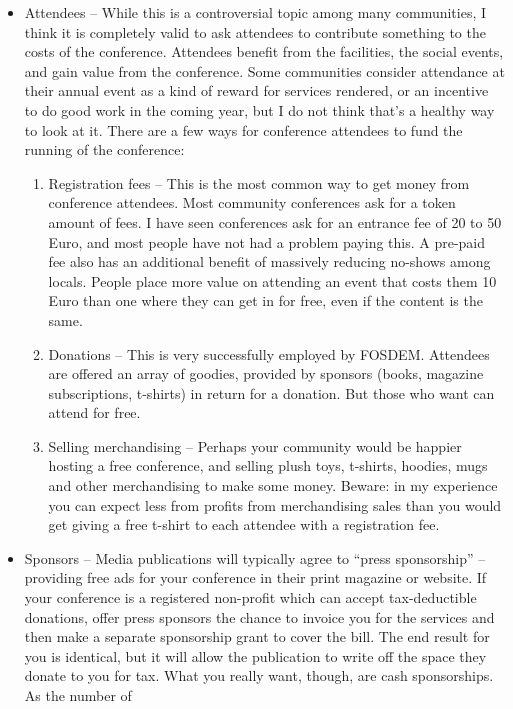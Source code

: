 \begin{itemize}
 \item Attendees -- While this is a controversial topic among many
communities, I think it is completely valid to ask attendees to
contribute something to the costs of the conference. Attendees benefit
from the facilities, the social events, and gain value from the conference.
Some communities consider attendance at their annual event as a kind of
reward for services rendered, or an incentive to do good work in the
coming year, but I do not think that's a healthy way to look at it.
There are a few ways for conference attendees to fund the running of
the conference:
 \begin{enumerate}
   \item Registration fees -- This is the most common way to get money from
conference attendees. Most community conferences ask for a token amount
of fees. I have seen conferences ask for an entrance fee of 20 to 50 Euro,
and most people have not had a problem paying this.
A pre-paid fee also has an additional benefit of massively reducing
no-shows among locals. People place more value on attending an event
that costs them 10 Euro than one where they can get in for free, even if the
content is the same.
   \item Donations -- This is very successfully employed by FOSDEM. Attendees are offered an array of goodies, provided by sponsors (books, magazine
subscriptions, t-shirts) in return for a donation. But those who want
can attend for free.
   \item Selling merchandising -- Perhaps your community would be happier
hosting a free conference, and selling plush toys, t-shirts, hoodies,
mugs and other merchandising to make some money. Beware: in my
experience you can expect less from profits from merchandising sales
than you would get giving a free t-shirt to each attendee with a
registration fee.
 \end{enumerate}
 \item Sponsors -- Media publications will typically agree to ``press
sponsorship'' -- providing free ads for your conference in their print
magazine or website. If your conference is a registered non-profit which
can accept tax-deductible donations, offer press sponsors the chance to
invoice you for the services and then make a separate sponsorship grant
to cover the bill. The end result for you is identical, but it will
allow the publication to write off the space they donate to you for tax.
What you really want, though, are cash sponsorships. As the number of

\end{itemize}
